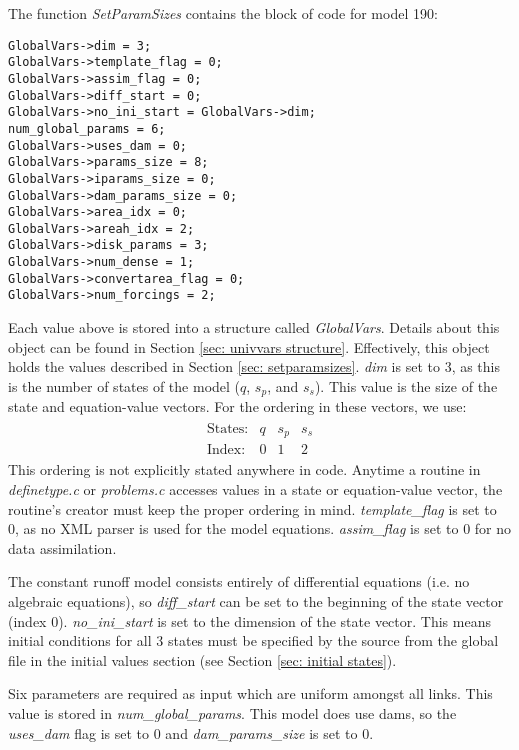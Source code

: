 \documentclass[12pt]{article}
\begin{document}
The function \emph{SetParamSizes} contains the block of code for model 190:
\begin{lstlisting}[style=CStyle]
GlobalVars->dim = 3;
GlobalVars->template_flag = 0;
GlobalVars->assim_flag = 0;
GlobalVars->diff_start = 0;
GlobalVars->no_ini_start = GlobalVars->dim;
num_global_params = 6;
GlobalVars->uses_dam = 0;
GlobalVars->params_size = 8;
GlobalVars->iparams_size = 0;
GlobalVars->dam_params_size = 0;
GlobalVars->area_idx = 0;
GlobalVars->areah_idx = 2;
GlobalVars->disk_params = 3;
GlobalVars->num_dense = 1;
GlobalVars->convertarea_flag = 0;
GlobalVars->num_forcings = 2;
\end{lstlisting}
Each value above is stored into a structure called \emph{GlobalVars}. Details about this object can be found in Section \ref{sec: univvars structure}. Effectively, this object holds the values described in Section \ref{sec: setparamsizes}. \emph{dim} is set to 3, as this is the number of states of the model ($q$, $s_p$, and $s_s$). This value is the size of the state and equation-value vectors. For the ordering in these vectors, we use:
\begin{align*}
 \begin{array}{ccccc}
    \mbox{States:} &  q  &  s_p  &  s_s \\
    \mbox{Index:} & 0 & 1 & 2 
 \end{array}
\end{align*}
This ordering is not explicitly stated anywhere in code. Anytime a routine in \emph{definetype.c} or \emph{problems.c} accesses values in a state or equation-value vector, the routine's creator must keep the proper ordering in mind. \emph{template\_flag} is set to 0, as no XML parser is used for the model equations. \emph{assim\_flag} is set to 0 for no data assimilation.

The constant runoff model consists entirely of differential equations (i.e. no algebraic equations), so \emph{diff\_start} can be set to the beginning of the state vector (index 0). \emph{no\_ini\_start} is set to the dimension of the state vector. This means initial conditions for all 3 states must be specified by the source from the global file in the initial values section (see Section \ref{sec: initial states}).

Six parameters are required as input which are uniform amongst all links. This value is stored in \emph{num\_global\_params}. This model does use dams, so the \emph{uses\_dam} flag is set to 0 and \emph{dam\_params\_size} is set to 0.
\end{document}
